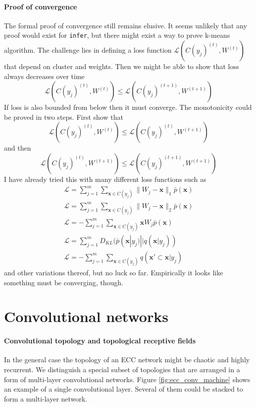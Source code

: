 \documentclass[12pt]{article}
\begin{document}
\paragraph{Proof of convergence}
The formal proof of convergence still remains elusive. It seems unlikely that any proof would exist for \texttt{infer}, but there might exist a way to prove k-means algorithm.
The challenge lies in defining a loss function $\mathcal{L}(C(y_j)^{(t)},W^{(t)})$ that depend on cluster and weights. Then we might be able to show that loss always decreases over time 
\[\mathcal{L}(C(y_j)^{(t)},W^{(t)})\le \mathcal{L}(C(y_j)^{(t+1)},W^{(t+1)})\] 
If loss is also bounded from below then it must converge. The monotonicity could be proved in two steps. First show that  
\[\mathcal{L}(C(y_j)^{(t)},W^{(t)})\le \mathcal{L}(C(y_j)^{(t)},W^{(t+1)})\] 
and then  
\[\mathcal{L}(C(y_j)^{(t)},W^{(t+1)})\le \mathcal{L}(C(y_j)^{(t+1)},W^{(t+1)})\] 
I have already tried this with many different loss functions such as
\begin{gather*}
\mathcal{L} = \sum_{j=1}^{m} \sum_{\boldsymbol{x}\in C(y_j)} \lVert  W_j - \boldsymbol{x}\rVert_1 \bar{p}(\boldsymbol{x}) \\
\mathcal{L} = \sum_{j=1}^{m} \sum_{\boldsymbol{x}\in C(y_j)} \lVert  W_j - \boldsymbol{x}\rVert_2 \bar{p}(\boldsymbol{x}) \\
\mathcal{L} = -\sum_{j=1}^{m} \sum_{\boldsymbol{x}\in C(y_j)} \boldsymbol{x}W_j  \bar{p}(\boldsymbol{x}) \\
\mathcal{L} = \sum_{j=1}^{m} D_{KL}(\bar{p}(\boldsymbol{x}|y_j)||q(\boldsymbol{x}|y_j))\\
\mathcal{L} =  -\sum_{j=1}^{m} \sum_{\boldsymbol{x}\in C(y_j)} q(\boldsymbol{x}'\subset \boldsymbol{x}|y_j)
\end{gather*}
and other variations thereof, but no luck so far. Empirically it looks like something must be converging, though.

\section{Convolutional networks}

\paragraph{Convolutional topology and topological receptive fields} In  the general case the topology of an ECC network might be chaotic and highly recurrent. We distinguish a special subset of topologies that are arranged in a form of multi-layer convolutional networks. Figure \ref{fig:ecc_conv_machine} shows an example of a single convolutional layer. Several of them could be stacked to form a multi-layer network. 
\end{document}
